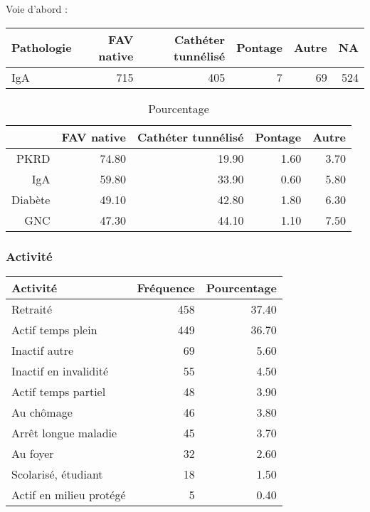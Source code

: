 \documentclass[11pt,a4paper]{article}\usepackage[]{graphicx}\usepackage[]{color}
\begin{document}
Voie d’abord :
\begin{table}[ht]
\centering
\begin{tabular}{lrrrrr}
  \hline
Pathologie & FAV native & Cathéter tunnélisé & Pontage & Autre & NA \\ 
  \hline
IgA & 715 & 405 &   7 &  69 & 524 \\ 
   \hline
\end{tabular}
\end{table}
\begin{table}[ht]
\centering
\begin{tabular}{rrrrr}
  \hline
 & FAV native & Cathéter tunnélisé & Pontage & Autre \\ 
  \hline
PKRD & 74.80 & 19.90 & 1.60 & 3.70 \\ 
  IgA & 59.80 & 33.90 & 0.60 & 5.80 \\ 
  Diabète & 49.10 & 42.80 & 1.80 & 6.30 \\ 
  GNC & 47.30 & 44.10 & 1.10 & 7.50 \\ 
   \hline
\end{tabular}
\caption{Pourcentage} 
\end{table}


    \subsubsection{Activité}

\begin{table}[H]
\centering
\begin{tabular}{lrr}
  \hline
Activité & Fréquence & Pourcentage \\ 
  \hline
Retraité & 458 & 37.40 \\ 
  Actif temps plein & 449 & 36.70 \\ 
  Inactif autre &  69 & 5.60 \\ 
  Inactif en invalidité &  55 & 4.50 \\ 
  Actif temps partiel &  48 & 3.90 \\ 
  Au chômage &  46 & 3.80 \\ 
  Arrêt longue maladie &  45 & 3.70 \\ 
  Au foyer &  32 & 2.60 \\ 
  Scolarisé, étudiant &  18 & 1.50 \\ 
  Actif en milieu protégé &   5 & 0.40 \\ 
   \hline
\end{tabular}
\end{table}
\end{document}
